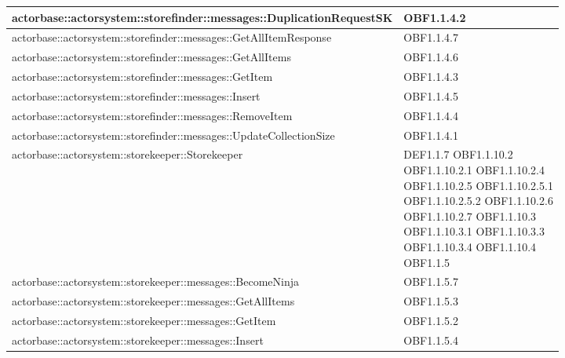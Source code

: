 \documentclass{scalatekids-article}
\begin{document}
\begin{longtable}[H]{|p{12cm}|p{5.5cm}|}
\hline
actorbase::actorsystem::storefinder::messages::DuplicationRequestSK & \multiLineCell[t]{OBF1.1.4.2\\}\\
\hline
actorbase::actorsystem::storefinder::messages::GetAllItemResponse & \multiLineCell[t]{OBF1.1.4.7\\}\\
\hline
actorbase::actorsystem::storefinder::messages::GetAllItems & \multiLineCell[t]{OBF1.1.4.6\\}\\
\hline
actorbase::actorsystem::storefinder::messages::GetItem & \multiLineCell[t]{OBF1.1.4.3\\}\\
\hline
actorbase::actorsystem::storefinder::messages::Insert & \multiLineCell[t]{OBF1.1.4.5\\}\\
\hline
actorbase::actorsystem::storefinder::messages::RemoveItem & \multiLineCell[t]{OBF1.1.4.4\\}\\
\hline
actorbase::actorsystem::storefinder::messages::UpdateCollectionSize & \multiLineCell[t]{OBF1.1.4.1\\}\\
\hline
actorbase::actorsystem::storekeeper::Storekeeper & \multiLineCell[t]{DEF1.1.7 OBF1.1.10.2\\OBF1.1.10.2.1 OBF1.1.10.2.4\\OBF1.1.10.2.5 OBF1.1.10.2.5.1\\OBF1.1.10.2.5.2 OBF1.1.10.2.6\\OBF1.1.10.2.7 OBF1.1.10.3\\OBF1.1.10.3.1 OBF1.1.10.3.3\\OBF1.1.10.3.4 OBF1.1.10.4\\OBF1.1.5}\\
\hline
actorbase::actorsystem::storekeeper::messages::BecomeNinja & \multiLineCell[t]{OBF1.1.5.7\\}\\
\hline
actorbase::actorsystem::storekeeper::messages::GetAllItems & \multiLineCell[t]{OBF1.1.5.3\\}\\
\hline
actorbase::actorsystem::storekeeper::messages::GetItem & \multiLineCell[t]{OBF1.1.5.2\\}\\
\hline
actorbase::actorsystem::storekeeper::messages::Insert & \multiLineCell[t]{OBF1.1.5.4\\}\\

\end{longtable}
\end{document}

